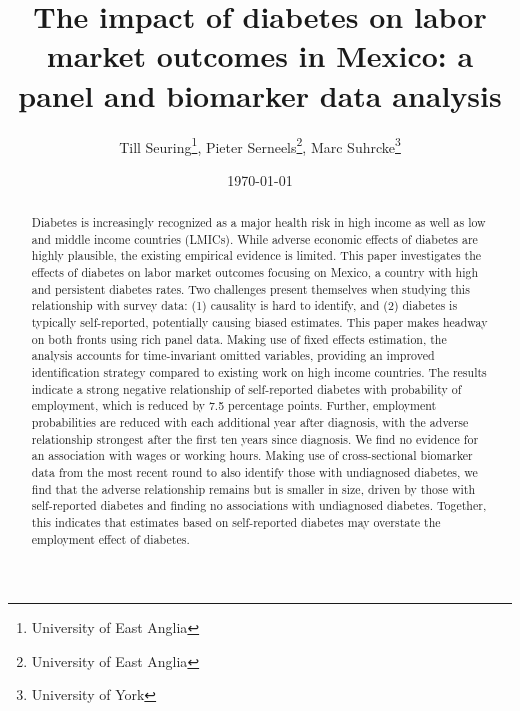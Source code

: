 \documentclass[12pt,english,british]{article}
\begin{document}
\title{The impact of diabetes on labor market outcomes in Mexico: a panel and biomarker data analysis}

\author{Till Seuring\footnote{University of East Anglia}, Pieter
Serneels\footnote{University of East Anglia}, Marc Suhrcke\footnote{University
  of York}}
\affil{}

\date{\today}


\maketitle 


\begin{abstract}
Diabetes is increasingly recognized as a major health risk in high income as well as low and middle income countries (LMICs). While adverse economic effects of diabetes are highly plausible, the existing empirical evidence is limited. This paper investigates the effects of diabetes on labor market outcomes focusing on Mexico, a country with high and persistent diabetes rates. Two challenges present themselves when studying this relationship with survey data: (1) causality is hard to identify, and (2) diabetes is typically self-reported, potentially causing biased estimates. This paper makes headway on both fronts using rich panel data. Making use of fixed effects estimation, the analysis accounts for time-invariant omitted variables, providing an improved identification strategy compared to existing work on high income countries. The results indicate a strong negative relationship of self-reported diabetes with probability of employment, which is reduced by 7.5 percentage points. Further, employment probabilities are reduced with each additional year after diagnosis, with the adverse relationship strongest after the first ten years since diagnosis. We find no evidence for an association with wages or working hours. 
Making use of cross-sectional biomarker data from the most recent round to also identify those with undiagnosed diabetes, we find that the adverse relationship remains but is smaller in size, driven by those with self-reported diabetes and finding no associations with undiagnosed diabetes. Together, this indicates that estimates based on self-reported diabetes may overstate the employment effect of diabetes. %
 


\end{abstract}
\end{document}
